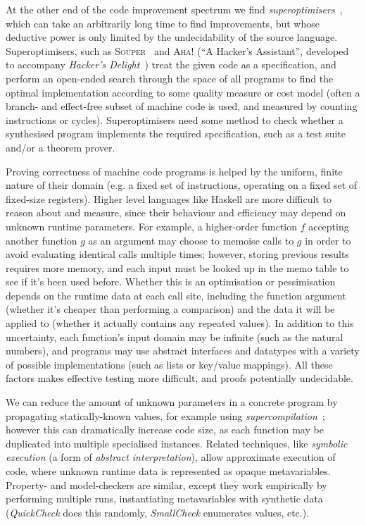 At the other end of the code improvement spectrum we find
\emph{superoptimisers}~\cite{massalin1987superoptimizer}, which can take an
arbitrarily long time to find improvements, but whose deductive power is only
limited by the undecidability of the source language. Superoptimisers, such as
\textsc{Souper}~\cite{sasnauskas2017souper} and \textsc{Aha!} (``A Hacker's
Assistant'', developed to accompany \emph{Hacker's
  Delight}~\cite{warren2013hacker}) treat the given code as a specification, and
perform an open-ended search through the space of all programs to find the
optimal implementation according to some quality measure or cost model (often a
branch- and effect-free subset of machine code is used, and measured by counting
instructions or cycles).  Superoptimisers need some method to check whether a
synthesised program implements the required specification, such as a test suite
and/or a theorem prover.

Proving correctness of machine code programs is helped by the uniform, finite
nature of their domain (e.g. a fixed set of instructions, operating on a fixed
set of fixed-size registers). Higher level languages like Haskell are more
difficult to reason about and measure, since their behaviour and efficiency may
depend on unknown runtime parameters. For example, a higher-order function $f$
accepting another function $g$ as an argument may choose to memoise calls to $g$
in order to avoid evaluating identical calls multiple times; however, storing
previous results requires more memory, and each input must be looked up in the
memo table to see if it's been used before. Whether this is an optimisation or
pessimisation depends on the runtime data at each call site, including the
function argument (whether it's cheaper than performing a comparison) and the
data it will be applied to (whether it actually contains any repeated values).
In addition to this uncertainty, each function's input domain may be infinite
(such as the natural numbers), and programs may use abstract interfaces and
datatypes with a variety of possible implementations (such as lists or key/value
mappings). All these factors makes effective testing more difficult, and proofs
potentially undecidable.

We can reduce the amount of unknown parameters in a concrete program by
propagating statically-known values, for example using
\emph{supercompilation}~\cite{Turchin:1986:CS:5956.5957}; however this can
dramatically increase code size, as each function may be duplicated into
multiple specialised instances. Related techniques, like \emph{symbolic
  execution} (a form of \emph{abstract interpretation}), allow approximate
execution of code, where unknown runtime data is represented as opaque
metavariables. Property- and model-checkers are similar, except they work
empirically by performing multiple runs, instantiating metavariables with
synthetic data (\emph{QuickCheck} does this randomly, \emph{SmallCheck}
enumerates values, etc.).


